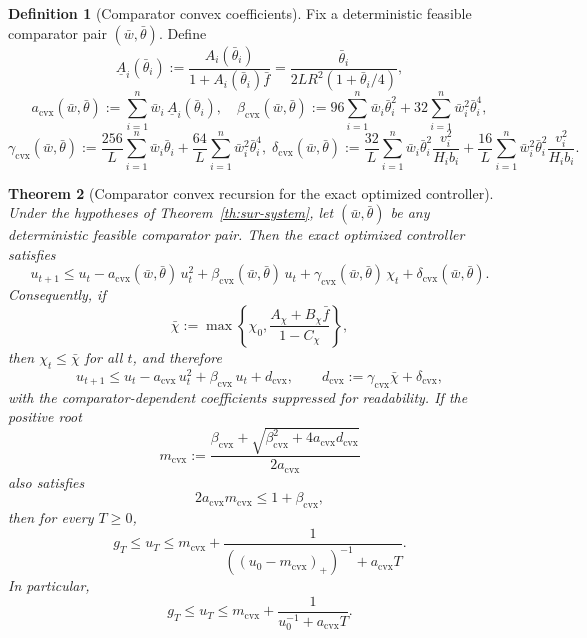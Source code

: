 \documentclass{article}
\newtheorem{theorem}{Theorem}[section]
\theoremstyle{definition}
\newtheorem{definition}[theorem]{Definition}
\begin{document}
\begin{definition}[Comparator convex coefficients]
\label{def:cvx-comp}
Fix a deterministic feasible comparator pair $(\bar w,\bar\theta)$. Define
\[
\underline A_i(\bar\theta_i)
:=
\frac{A_i(\bar\theta_i)}{1+A_i(\bar\theta_i)\bar f}
=
\frac{\bar\theta_i}{2LR^2(1+\bar\theta_i/4)},
\]
\[
a_{\mathrm{cvx}}(\bar w,\bar\theta)
:=
\sum_{i=1}^n \bar w_i\,\underline A_i(\bar\theta_i),\quad\beta_{\mathrm{cvx}}(\bar w,\bar\theta)
:=
96\sum_{i=1}^n \bar w_i \bar\theta_i^2
+
32\sum_{i=1}^n \bar w_i^2 \bar\theta_i^4,
\]
\[
\gamma_{\mathrm{cvx}}(\bar w,\bar\theta)
:=
\frac{256}{L}\sum_{i=1}^n \bar w_i \bar\theta_i
+
\frac{64}{L}\sum_{i=1}^n \bar w_i^2 \bar\theta_i^4,\;\delta_{\mathrm{cvx}}(\bar w,\bar\theta)
:=
\frac{32}{L}\sum_{i=1}^n \bar w_i \bar\theta_i^2\frac{v_i^2}{H_i b_i}
+
\frac{16}{L}\sum_{i=1}^n \bar w_i^2 \bar\theta_i^2\frac{v_i^2}{H_i b_i}.
\]
\end{definition}

\begin{theorem}[Comparator convex recursion for the exact optimized controller]
\label{th:sur-cvx}
Under the hypotheses of Theorem~\ref{th:sur-system}, let
$(\bar w,\bar\theta)$ be any deterministic feasible comparator pair. Then the
exact optimized controller satisfies
\begin{equation}
u_{t+1}
\le
u_t
-
a_{\mathrm{cvx}}(\bar w,\bar\theta)\,u_t^2
+
\beta_{\mathrm{cvx}}(\bar w,\bar\theta)\,u_t
+
\gamma_{\mathrm{cvx}}(\bar w,\bar\theta)\,\chi_t
+
\delta_{\mathrm{cvx}}(\bar w,\bar\theta).
\label{eq:cvx-rec-main}\end{equation}
Consequently, if
\begin{equation}
\bar\chi
:=
\max\left\{
\chi_0,
\frac{A_\chi+B_\chi \bar f}{1-C_\chi}
\right\},
\label{eq:chi-bar-main}\end{equation}
then $\chi_t\le \bar\chi$ for all $t$, and therefore
\begin{equation}
u_{t+1}
\le
u_t
-
a_{\mathrm{cvx}}\,u_t^2
+
\beta_{\mathrm{cvx}}\,u_t
+
d_{\mathrm{cvx}},
\qquad
d_{\mathrm{cvx}}:=\gamma_{\mathrm{cvx}}\bar\chi+\delta_{\mathrm{cvx}},
\label{eq:cvx-rec-closed-main}\end{equation}
with the comparator-dependent coefficients suppressed for readability.
If the positive root
\[
m_{\mathrm{cvx}}
:=
\frac{
\beta_{\mathrm{cvx}}
+
\sqrt{\beta_{\mathrm{cvx}}^2+4a_{\mathrm{cvx}}d_{\mathrm{cvx}}}
}{2a_{\mathrm{cvx}}}
\]
also satisfies
\[
2a_{\mathrm{cvx}}m_{\mathrm{cvx}}\le 1+\beta_{\mathrm{cvx}},
\]
then for every $T\ge 0$,
\[
g_T\le u_T\le
m_{\mathrm{cvx}}+
\frac{1}{((u_0-m_{\mathrm{cvx}})_+)^{-1}+a_{\mathrm{cvx}}T}.
\]
In particular,
\[
g_T\le u_T\le m_{\mathrm{cvx}}+\frac{1}{u_0^{-1}+a_{\mathrm{cvx}}T}.
\]
\end{theorem}
\end{document}
